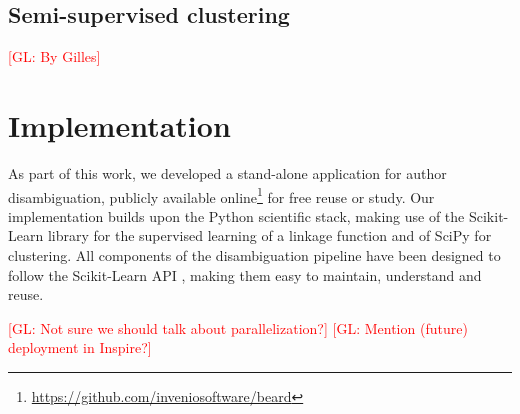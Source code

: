 \documentclass{article}
\newcommand{\glnote}[1]{\textcolor{red}{[GL: #1]}}
\begin{document}

\subsection{Semi-supervised clustering}
\label{methods:clustering}
\glnote{By Gilles}






\section{Implementation}
\label{implementation}

As part of this work, we developed a stand-alone application for author
disambiguation, publicly available
online\footnote{\url{https://github.com/inveniosoftware/beard}} for free reuse
or study.  Our implementation builds upon the Python scientific stack, making
use of the Scikit-Learn library \citep{scikitlearn} for the supervised learning
of a linkage function and of SciPy \citep{scipy} for clustering. All
components of the disambiguation pipeline have been designed to follow the
Scikit-Learn API \citep{scikitlearnAPI}, making them easy to maintain,
understand and reuse.

\glnote{Not sure we should talk about parallelization?}
\glnote{Mention (future) deployment in Inspire?}

\end{document}
